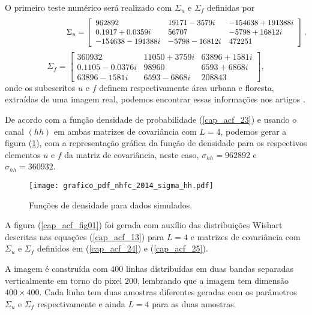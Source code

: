 O primeiro teste numérico será realizado com $\Sigma_u$ e $\Sigma_f$ definidas por
\begin{equation}\label{cap_acf_24}
	\hspace{2.75cm} \Sigma_{u}= \left[
\begin{array}{lll}
	962892             &19171 - 3579i&     -154638 + 191388i \\
	0.1917 + 0.0359i   &56707        &     -5798 + 16812i  \\
	-154638 - 191388i  &-5798 - 16812i&      472251 
\end{array}
\right],
\end{equation}
\begin{equation}\label{cap_acf_25}
 \Sigma_{f}= \left[
\begin{array}{lll}
	360932            & 11050 + 3759i&   63896 + 1581i \\
	0.1105 - 0.0376i  & 98960       &   6593 + 6868i \\
	63896  - 1581i    & 6593  - 6868i&   208843
\end{array}
\right],
\end{equation}
onde os subescritos $u$ e $f$ definem respectivamente área urbana e floresta, extraídas de uma imagem real, podemos encontrar essas informações nos artigos \citep{fbgm, nhfc}.

De acordo com a função densidade de probabilidade (\ref{cap_acf_23}) e usando o canal $(hh)$ em ambas matrizes de covariância com $L=4$, podemos gerar a figura (\ref{cap_acf_fig02}), com a representação gráfica da função de densidade para os respectivos elementos $u$ e $f$ da matriz de covariância, neste caso, $\sigma_{hh}=962892$ e $\sigma_{hh}= 360932$. 

\begin{figure}[hbt]
	\centering
  \texttt{[image: grafico\_pdf\_nhfc\_2014\_sigma\_hh.pdf]}
	\caption{Funções de densidade para dados simulados.}\label{cap_acf_fig02}
\end{figure}

A figura (\ref{cap_acf_fig01}) foi gerada com auxílio das distribuições Wishart descritas nas equações (\ref{cap_acf_13}) para $L=4$ e matrizes de covariância com $\Sigma_{u}$ e $\Sigma_{f}$ definidos em (\ref{cap_acf_24}) e (\ref{cap_acf_25}).

	
A imagem é construída com $400$ linhas distribuídas em duas bandas separadas verticalmente em torno do pixel $200$, lembrando que a imagem tem dimensão $400 \times 400$. Cada linha  tem duas amostras diferentes geradas com os parâmetros $\Sigma_{u}$ e $\Sigma_{f}$ respectivamente e ainda $L=4$ para as duas amostras.  

